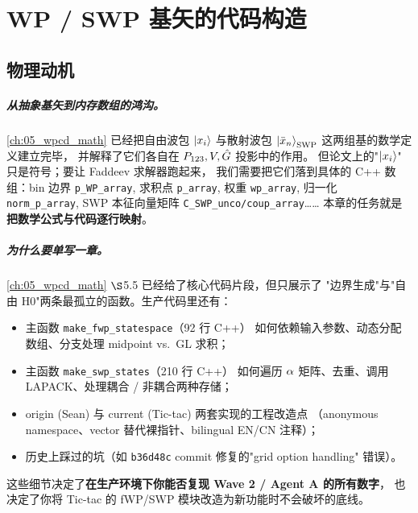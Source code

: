 
\chapter{WP / SWP 基矢的代码构造}
\label{ch:06_wp_swp_states}

\section{物理动机}
\label{sec:ch06-motivation}

\paragraph{从抽象基矢到内存数组的鸿沟。}
\cref{ch:05_wpcd_math} 已经把自由波包 \(\ket{x_{i}}\) 与散射波包
\(\ket{\bar{x}_n}_{\rm SWP}\) 这两组基的数学定义建立完毕，
并解释了它们各自在 \(P_{123}, V, \hat{G}\) 投影中的作用。
但论文上的"\(\ket{x_{i}}\)" 只是符号；要让 Faddeev 求解器跑起来，
我们需要把它们落到具体的 C++ 数组：bin 边界 \texttt{p\_WP\_array},
求积点 \texttt{p\_array}, 权重 \texttt{wp\_array},
归一化 \texttt{norm\_p\_array}, SWP 本征向量矩阵
\texttt{C\_SWP\_unco/coup\_array}……
本章的任务就是\textbf{把数学公式与代码逐行映射}。

\paragraph{为什么要单写一章。}
\cref{ch:05_wpcd_math} \(\S\)5.5 已经给了核心代码片段，但只展示了
"边界生成"与"自由 H0"两条最孤立的函数。生产代码里还有：
\begin{itemize}
  \item 主函数 \texttt{make\_fwp\_statespace}（92 行 C++）
        如何依赖输入参数、动态分配数组、分支处理 midpoint vs.~GL 求积；
  \item 主函数 \texttt{make\_swp\_states}（210 行 C++）
        如何遍历 \(\alpha\) 矩阵、去重、调用 LAPACK、处理耦合 / 非耦合两种存储；
  \item origin (Sean) 与 current (Tic-tac) 两套实现的工程改造点
        （anonymous namespace、vector 替代裸指针、bilingual EN/CN 注释）；
  \item 历史上踩过的坑（如 \texttt{b36d48c} commit 修复的"grid option
        handling" 错误）。
\end{itemize}
这些细节决定了\textbf{在生产环境下你能否复现 Wave 2 / Agent A 的所有数字}，
也决定了你将 Tic-tac 的 fWP/SWP 模块改造为新功能时不会破坏的底线。

